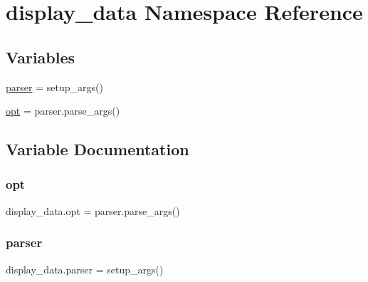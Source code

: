 \hypertarget{namespacedisplay__data}{}\section{display\+\_\+data Namespace Reference}
\label{namespacedisplay__data}
\subsection*{Variables}
\begin{DoxyCompactItemize}
\item 
\hyperlink{namespacedisplay__data_aa3243f42a25038810d228d5d226a038c}{parser} = setup\+\_\+args()
\item 
\hyperlink{namespacedisplay__data_a52acd52b27bb3118944fbb9cf76caaf4}{opt} = parser.\+parse\+\_\+args()
\end{DoxyCompactItemize}


\subsection{Variable Documentation}
\mbox{\label{namespacedisplay__data_a52acd52b27bb3118944fbb9cf76caaf4}} 
\subsubsection{\texorpdfstring{opt}{opt}}
{\footnotesize\ttfamily display\+\_\+data.\+opt = parser.\+parse\+\_\+args()}

\mbox{\label{namespacedisplay__data_aa3243f42a25038810d228d5d226a038c}} 
\subsubsection{\texorpdfstring{parser}{parser}}
{\footnotesize\ttfamily display\+\_\+data.\+parser = setup\+\_\+args()}

